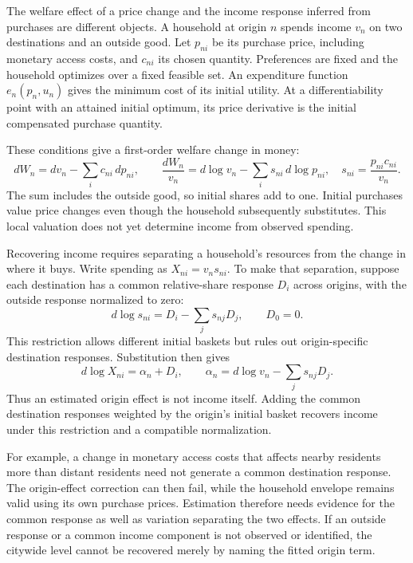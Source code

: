 The welfare effect of a price change and the income response inferred from
purchases are different objects. A household at origin $n$ spends income $v_n$
on two destinations and an outside good. Let $p_{ni}$ be its purchase price,
including monetary access costs, and $c_{ni}$ its chosen quantity. Preferences
are fixed and the household optimizes over a fixed feasible set. An expenditure
function $e_n(p_n,u_n)$ gives the minimum cost of its initial utility. At a
differentiability point with an attained initial optimum, its price derivative
is the initial compensated purchase quantity.

These conditions give a first-order welfare change in money:
\[
 dW_n=dv_n-\sum_i c_{ni}\,dp_{ni},\qquad
 \frac{dW_n}{v_n}=d\log v_n-\sum_i s_{ni}\,d\log p_{ni},
 \quad s_{ni}=\frac{p_{ni}c_{ni}}{v_n}.
\]
The sum includes the outside good, so initial shares add to one. Initial
purchases value price changes even though the household subsequently substitutes.
This local valuation does not yet determine income from observed spending.

Recovering income requires separating a household's resources from the change
in where it buys. Write spending as $X_{ni}=v_n s_{ni}$. To make that separation,
suppose each destination has a common relative-share response $D_i$ across
origins, with the outside response normalized to zero:
\[
 d\log s_{ni}=D_i-\sum_j s_{nj}D_j,\qquad D_0=0.
\]
This restriction allows different initial baskets but rules out origin-specific
destination responses. Substitution then gives
\[
 d\log X_{ni}=\alpha_n+D_i,\qquad
 \alpha_n=d\log v_n-\sum_j s_{nj}D_j.
\]
Thus an estimated origin effect is not income itself. Adding the common
destination responses weighted by the origin's initial basket recovers income
under this restriction and a compatible normalization.

For example, a change in monetary access costs that affects nearby residents
more than distant residents need not generate a common destination response.
The origin-effect correction can then fail, while the household envelope remains
valid using its own purchase prices. Estimation therefore needs evidence for
the common response as well as variation separating the two effects. If an
outside response or a common income component is not observed or identified,
the citywide level cannot be recovered merely by naming the fitted origin term.
